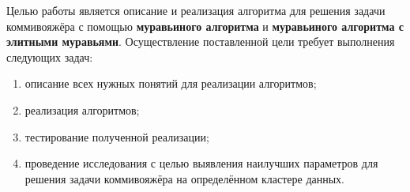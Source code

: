 Целью работы является описание и реализация алгоритма для решения задачи коммивояжёра с помощью \textbf{муравьиного алгоритма} и \textbf{муравьиного алгоритма с элитными муравьями}. 
Осуществление поставленной цели требует выполнения следующих задач:
\begin{enumerate}
	\item описание всех нужных понятий для реализации алгоритмов;
	\item реализация алгоритмов;
	\item тестирование полученной реализации;
	\item проведение исследования с целью выявления наилучших параметров для решения задачи коммивояжёра на определённом кластере данных.
\end{enumerate}
\clearpage
